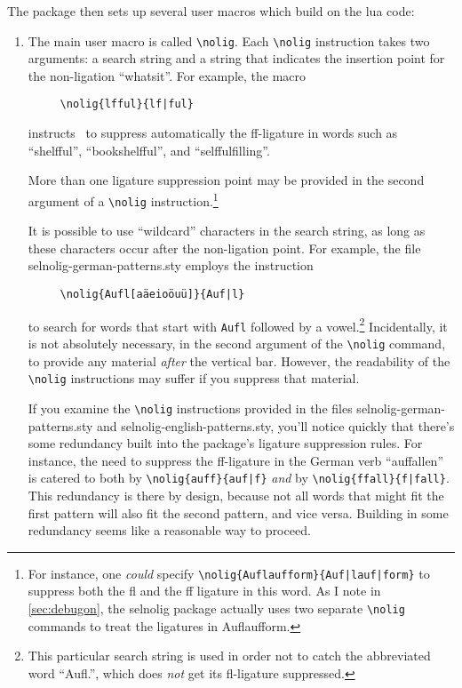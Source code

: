 \documentclass[12pt]{article}
\newcommand{\pkg}[1]{\textsf{#1}}
\newcommand{\opt}[1]{\texttt{#1}}
\newcommand{\cmmd}[1]{\texttt{\textbackslash #1}}
\begin{document}
The package then sets up several user macros which build on the lua code:
\begin{enumerate}
\item The main user macro is called \cmmd{nolig}. Each \cmmd{nolig} instruction takes two arguments: a search string and a string that indicates the insertion point for the non-ligation \enquote{whatsit}. For example, the macro
\begin{Verbatim}
     \nolig{lfful}{lf|ful}
\end{Verbatim}
instructs \LuaLaTeX\ to suppress automatically the ff-ligature in words such as \enquote{shelfful}, \enquote{bookshelfful}, and \enquote{selffulfilling}. 

More than one ligature suppression point may be provided in the second argument of a \cmmd{nolig} instruction.\footnote{For instance, one \emph{could} specify \Verb+\nolig{Auflaufform}{Auf|lauf|form}+ to suppress both the fl and the ff ligature in this word. As I note in \cref{sec:debugon}, the \pkg{selnolig} package actually uses two separate \cmmd{nolig} commands to treat the ligatures in Auflaufform. }


It is possible to use \enquote{wildcard} characters in the search string, as long as these characters occur after the non-ligation point. For example, the file \pkg{selnolig-german-patterns.sty} employs the instruction 
\begin{Verbatim}
     \nolig{Aufl[aäeioöuü]}{Auf|l}
\end{Verbatim}
to search for words that start with \opt{Aufl} followed by a vowel.\footnote{This particular search string is used in order not to catch the abbreviated word \enquote{Aufl.}, which does \emph{not} get its fl-ligature suppressed.} Incidentally, it is not absolutely necessary, in the second argument of the \cmmd{nolig} command, to provide any material \emph{after} the vertical bar. However, the readability of the \cmmd{nolig} instructions may suffer if you suppress that material.

If you examine the \cmmd{nolig} instructions provided in the files \pkg{selnolig-german-patterns.sty} and \pkg{selnolig-english-patterns.sty}, you'll notice quickly that there's some redundancy built into the package's ligature suppression rules. For instance, the need to suppress the ff-ligature in the German verb \enquote{auffallen} is catered to both by \Verb+\nolig{auff}{auf|f}+ \emph{and} by \Verb+\nolig{ffall}{f|fall}+. This redundancy is there by design, because not all words that might fit the first pattern will also fit the second pattern, and vice versa. Building in some redundancy seems like a reasonable way to proceed.


\end{enumerate}
\end{document}
